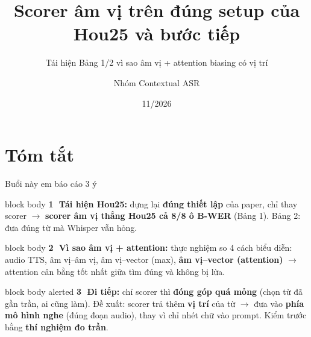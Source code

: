 \documentclass[aspectratio=169,xcolor=table]{beamer}
\title{Scorer âm vị trên đúng setup của Hou25 và bước tiếp}
\subtitle{Tái hiện Bảng 1/2 \ra{} vì sao âm vị + attention \ra{} biasing có vị trí}
\author{Nhóm Contextual ASR}
\institute{}
\date{11/2026}
\newcommand{\hi}[1]{\textcolor{Primary}{\textbf{#1}}}
\newcommand{\bad}[1]{\textcolor{RiskRed}{\textbf{#1}}}
\newcommand{\good}[1]{\textcolor{GoodGreen}{\textbf{#1}}}
\newcommand{\ra}{$\rightarrow$}
\begin{document}
\begin{frame}[plain]\titlepage\end{frame}

\section{Tóm tắt}
\begin{frame}{Buổi này em báo cáo 3 ý}
\begin{beamercolorbox}[sep=0.5em,rounded=true]{block body}
\textbf{\textcircled{\scriptsize 1} Tái hiện Hou25:} dựng lại \textbf{đúng thiết lập} của paper, chỉ thay scorer \ra{} \good{scorer âm vị thắng Hou25 cả 8/8 ô B-WER} (Bảng 1). Bảng 2: đưa đúng từ mà Whisper vẫn hỏng.
\end{beamercolorbox}
\vspace{0.12cm}
\begin{beamercolorbox}[sep=0.5em,rounded=true]{block body}
\textbf{\textcircled{\scriptsize 2} Vì sao âm vị + attention:} thực nghiệm so 4 cách biểu diễn: audio TTS, âm vị--âm vị, âm vị--vector (max), \textbf{âm vị--vector (attention)} \ra{} attention cân bằng tốt nhất giữa tìm đúng và không bị lừa.
\end{beamercolorbox}
\vspace{0.12cm}
\begin{beamercolorbox}[sep=0.5em,rounded=true]{block body alerted}
\textbf{\textcircled{\scriptsize 3} Đi tiếp:} chỉ scorer thì \bad{đóng góp quá mỏng} (chọn từ đã gần trần, ai cũng làm). Đề xuất: scorer trả thêm \hi{vị trí} của từ \ra{} đưa vào \textbf{phía mô hình nghe} (đúng đoạn audio), thay vì chỉ nhét chữ vào prompt. Kiểm trước bằng \textbf{thí nghiệm đo trần}.
\end{beamercolorbox}
\end{frame}

\end{document}
